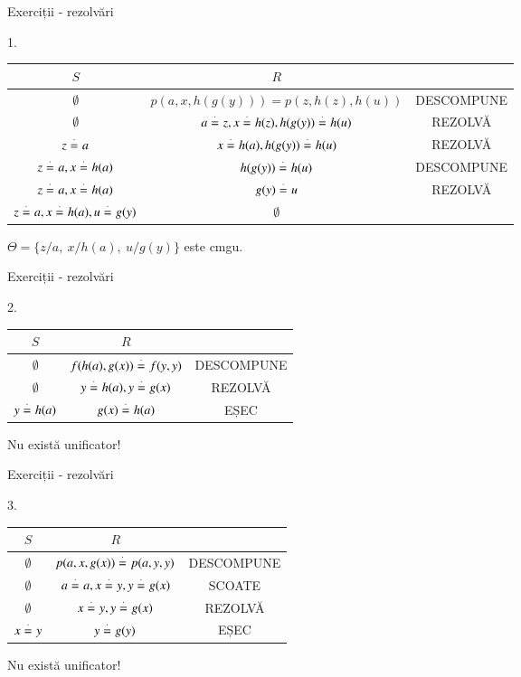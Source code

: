 \documentclass[xcolor=pdftex,romanian,colorlinks]{beamer}
\begin{document}
\begin{frame}{Exerciții - rezolvări}

{\footnotesize
1.

\begin{tabular}{|c|c|c|}
\hline
$S$ & $R$ & \\ \hline 
$\emptyset$ & $p(a, x, h(g(y)))= p(z, h(z), h(u))$ & DESCOMPUNE \\ \hline  
$\emptyset$ & $a \stackrel{\cdot}{=}_{} z, x \stackrel{\cdot}{=}_{} h(z), h(g(y)) \stackrel{\cdot}{=}_{} h(u)$ & REZOLVĂ\\ \hline  
$z \stackrel{\cdot}{=}_{} a$ & $x \stackrel{\cdot}{=}_{} h(a), h(g(y)) \stackrel{\cdot}{=}_{} h(u)$ & REZOLVĂ\\ \hline
$z \stackrel{\cdot}{=}_{} a, x \stackrel{\cdot}{=}_{} h(a)$ & $h(g(y)) \stackrel{\cdot}{=}_{} h(u)$ & DESCOMPUNE\\ \hline
$z \stackrel{\cdot}{=}_{} a, x \stackrel{\cdot}{=}_{} h(a)$ & $g(y) \stackrel{\cdot}{=}_{} u$ & REZOLVĂ\\ \hline
$z \stackrel{\cdot}{=}_{} a, x \stackrel{\cdot}{=}_{} h(a), u \stackrel{\cdot}{=}_{} g(y)$ & $\emptyset$ & \\ \hline
\end{tabular}

\vspace{.2cm}
$\Theta = \{z / a,\ x / h(a),\ u / g(y) \}$ este cmgu.

}
\end{frame}


\begin{frame}{Exerciții - rezolvări}

{\footnotesize
2.

\begin{tabular}{|c|c|c|}
\hline
$S$ & $R$ & \\ \hline 
$\emptyset$ & $f(h(a), g(x)) \stackrel{\cdot}{=}_{} f(y,y)$ & DESCOMPUNE \\ \hline  
$\emptyset$ & $y \stackrel{\cdot}{=}_{} h(a), y \stackrel{\cdot}{=}_{} g(x)$ & REZOLVĂ \\ \hline  
$y \stackrel{\cdot}{=}_{} h(a)$ & $g(x) \stackrel{\cdot}{=}_{} h(a)$ & EȘEC \\ \hline  
\end{tabular}

 Nu există unificator!

}
\end{frame}

\begin{frame}{Exerciții - rezolvări}

{\footnotesize
3.

\begin{tabular}{|c|c|c|}
\hline
$S$ & $R$ & \\ \hline 
$\emptyset$ & $p(a, x, g(x)) \stackrel{\cdot}{=}_{} p(a, y, y)$ & DESCOMPUNE \\ \hline  
$\emptyset$ & $a \stackrel{\cdot}{=}_{} a, x \stackrel{\cdot}{=}_{} y, y \stackrel{\cdot}{=}_{} g(x)$ & SCOATE\\ \hline  
$\emptyset$ & $x \stackrel{\cdot}{=}_{} y, y \stackrel{\cdot}{=}_{} g(x)$ & REZOLVĂ\\ \hline  
$x \stackrel{\cdot}{=}_{} y$ & $y \stackrel{\cdot}{=}_{} g(y)$ & EȘEC\\ \hline  
\end{tabular}

Nu există unificator!

}
\end{frame}
\end{document}
